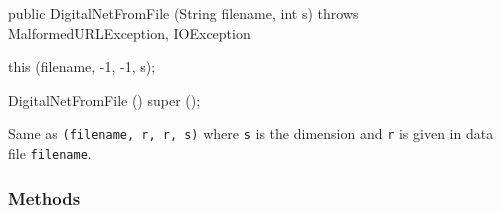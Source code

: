 \begin{code}

   public DigitalNetFromFile (String filename, int s)
          throws MalformedURLException, IOException \begin{hide}
   {
       this (filename, -1, -1, s);
   }

   DigitalNetFromFile ()
   {
       super ();
   }\end{hide}
\end{code}
\begin{tabb}
   Same as \texttt{(filename, r, r, s)} where
   \texttt{s} is the dimension and  \texttt{r} is given in data file \texttt{filename}.
\end{tabb}
\begin{htmlonly}
\end{htmlonly}



\subsubsection*{Methods}

